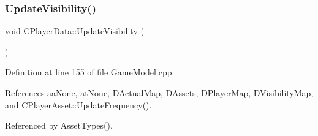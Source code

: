 \subsubsection{\texorpdfstring{Update\+Visibility()}{UpdateVisibility()}}
{\footnotesize\ttfamily void C\+Player\+Data\+::\+Update\+Visibility (\begin{DoxyParamCaption}{ }\end{DoxyParamCaption})}



Definition at line 155 of file Game\+Model.\+cpp.



References aa\+None, at\+None, D\+Actual\+Map, D\+Assets, D\+Player\+Map, D\+Visibility\+Map, and C\+Player\+Asset\+::\+Update\+Frequency().



Referenced by Asset\+Types().



